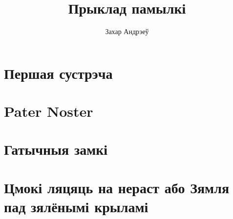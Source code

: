 \documentclass[oneside]{book}
\title{Прыклад памылкі}
\author{Захар Андрэеў}
\begin{document}
\maketitle
\tableofcontents

\chapter{Першая сустрэча}

\chapter{Pater Noster}

\chapter{Гатычныя замкі}

\chapter{Цмокі ляцяць на нераст або Зямля пад зялёнымі крыламі}
\end{document}
